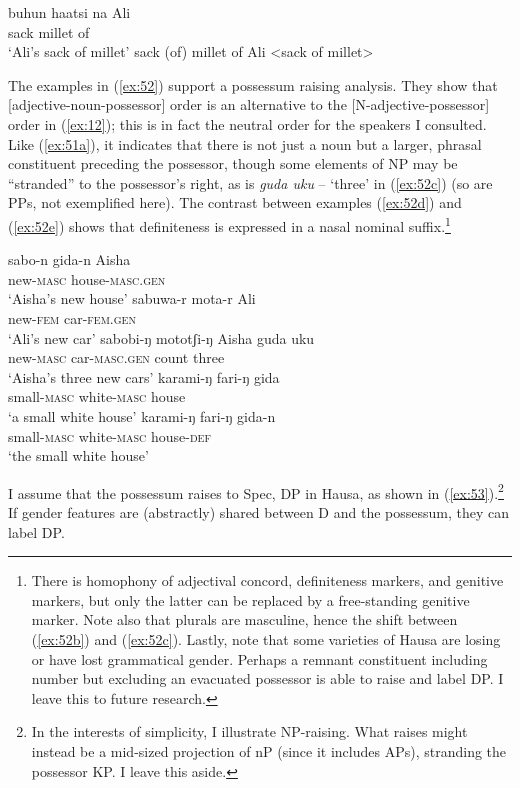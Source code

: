 \documentclass[output=paper
,modfonts
,nonflat]{langsci/langscibook}
\begin{document}
\begin{exe}
	\ex \label{ex:51}
	\xlist
	\ex \label{ex:51a}
	\gll buhun haatsi na Ali\\
	sack     millet  of\\
	\glt `Ali's sack of millet'  	
	\ex {\lbrack}sack (of) millet{\rbrack} of Ali <sack of millet> \label{ex:51b}
	
	\endxlist
\end{exe}
The examples in (\ref{ex:52}) support a possessum raising analysis. They show that [adjective-noun-possessor] order is an alternative to the [N-adjective-possessor] order in (\ref{ex:12}); this is in fact the neutral order for the speakers I consulted. Like (\ref{ex:51a}), it indicates that there is not just a noun but a larger, phrasal constituent preceding the possessor, though some elements of NP may be “stranded” to the possessor’s right, as is \textit{guda uku} – ‘three’ in (\ref{ex:52c}) (so are PPs, not exemplified here). The contrast between examples (\ref{ex:52d}) and (\ref{ex:52e}) shows that definiteness is expressed in a nasal nominal suffix.\footnote{There is homophony of adjectival concord, definiteness markers, and genitive markers, but only the latter can be replaced by a free-standing genitive marker. Note also that plurals are masculine, hence the shift between (\ref{ex:52b}) and (\ref{ex:52c}). Lastly, note that some varieties of Hausa are losing or have lost grammatical gender. Perhaps a remnant constituent including number but excluding an evacuated possessor is able to raise and label DP. I leave this to future research.}
\begin{exe}
	\ex \label{ex:52}
	\xlist
	\ex \label{ex:52a}
	\gll sabo-n        gida-n           Aisha\\
	new-\textsc{masc}  house-\textsc{masc.gen}\\
	\glt `Aisha's new house'  	
	\ex \label{ex:52b}
	\gll sabuwa-r     mota-r       Ali\\
	new-\textsc{fem}     car-\textsc{fem.gen}\\
	\glt `Ali's new car'
	\ex \label{ex:52c}
	\gll sabobi-ŋ     mototʃi-ŋ       Aisha   guda     uku\\
	new-\textsc{masc}  car-\textsc{masc.gen}    {}        count     three\\
	\glt `Aisha's three new cars'  	
	\ex \label{ex:52d}
	\gll karami-ŋ   fari-ŋ       gida\\
	small-\textsc{masc}  white-\textsc{masc}   house\\
	\glt `a small white house'	
	\ex \label{ex:52e}
	\gll karami-ŋ     fari-ŋ         gida-n\\
	small-\textsc{masc}     white-\textsc{masc}  house-\textsc{def}\\
	\glt `the small white house'	
	\endxlist
\end{exe}
I assume that the possessum raises to Spec, DP in Hausa, as shown in (\ref{ex:53}).\footnote{In the interests of simplicity, I illustrate NP-raising. What raises might instead be a mid-sized projection of nP (since it includes APs), stranding the possessor KP. I leave this aside.} If gender features are (abstractly) shared between D and the possessum, they can label DP. 
\end{document}
